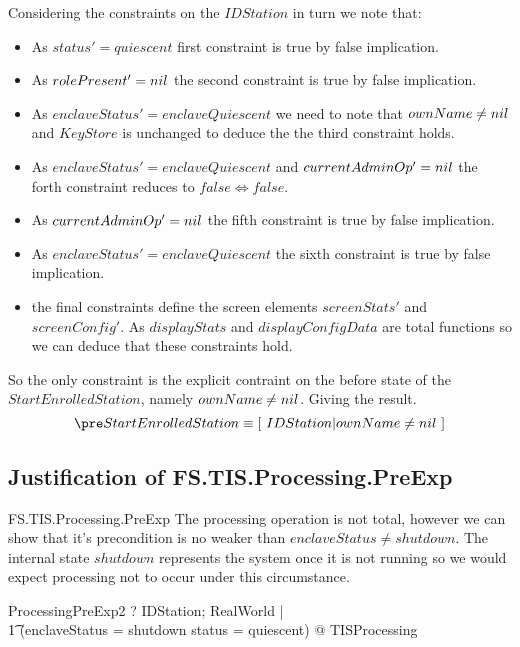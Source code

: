 Considering the constraints on the $IDStation$ in turn we note that:
\begin{itemize}
\item
As $status' = quiescent$ first constraint is true by false
implication.
\item
As $rolePresent' = nil$ the second constraint is true by false
implication.
\item
As $enclaveStatus' = enclaveQuiescent$  we need to note that $ownName
\neq nil$ and $KeyStore$ is unchanged to deduce the the third
constraint holds.
\item
As $enclaveStatus' = enclaveQuiescent$ and $currentAdminOp' = nil$ the forth
constraint reduces to $false \iff false$.
\item
As $currentAdminOp' = nil$ the fifth constraint is true by false implication.
\item
As $enclaveStatus' = enclaveQuiescent$ the sixth constraint is true by false
implication.
\item
the final constraints define the screen elements $screenStats'$ and
$screenConfig'$. As $displayStats$ and $displayConfigData$ are total
functions so we can deduce that these constraints hold.
\end{itemize}

So the only constraint is the explicit contraint on the before state
of the $StartEnrolledStation$, namely $ownName \neq nil$. Giving the
result.
\[
\pre StartEnrolledStation \equiv [~ IDStation | ownName \neq \Nil ~] 
\]

\subsection{Justification of FS.TIS.Processing.PreExp}

\begin{Zpobtrace}{FS.TIS.Processing.PreExp}
The processing operation is not total, however we can show that it's precondition
is no weaker than $enclaveStatus \neq shutdown$. The internal state
$shutdown$ represents the system once it is not running so we would
expect processing not to occur under this circumstance. 

\begin{theorem}{ProcessingPreExp2} \vdash? 
\forall       IDStation; RealWorld | 
\\ \t1 \lnot (enclaveStatus = shutdown \land status = quiescent) @ \pre TISProcessing
\end{theorem}
\end{Zpobtrace}

